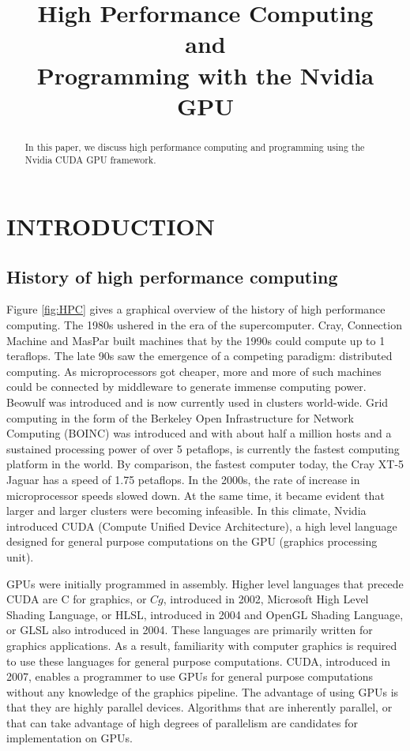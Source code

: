 \documentclass{article}
\title{High Performance Computing \\and\\Programming with the Nvidia GPU}
\begin{document}
\maketitle

\begin{abstract}
In this paper, we discuss high performance computing and programming using the Nvidia CUDA GPU framework.
\end{abstract}


\section{INTRODUCTION}
\subsection{History of high performance computing}
Figure \ref{fig:HPC} gives a graphical overview of the history of high performance computing.  The 1980s ushered in the era of the supercomputer.  Cray, Connection Machine and MasPar built machines that by the 1990s could compute up to 1 teraflops.  The late 90s saw the emergence of a competing paradigm: distributed computing.  As microprocessors got cheaper, more and more of such machines could be connected by middleware to generate immense computing power.  Beowulf was introduced and is now currently used in clusters world-wide.  Grid computing in the form of the Berkeley Open Infrastructure for Network Computing (BOINC) was introduced and with about half a million hosts and a sustained processing power of over 5 petaflops, is currently the fastest computing platform in the world.  By comparison, the fastest computer today, the Cray XT-5 Jaguar has a speed of 1.75 petaflops.  In the 2000s, the rate of increase in microprocessor speeds slowed down.  At the same time, it became evident that larger and larger clusters were becoming infeasible.  In this climate, Nvidia introduced CUDA (Compute Unified Device Architecture), a high level language designed for general purpose computations on the GPU (graphics processing unit).

GPUs were initially programmed in assembly.  Higher level languages that precede CUDA are C for graphics, or $Cg$, introduced in 2002, Microsoft High Level Shading Language, or HLSL, introduced in 2004 and OpenGL Shading Language, or GLSL also introduced in 2004.  These languages are primarily written for graphics applications.  As a result, familiarity with computer graphics is required to use these languages for general purpose computations.  CUDA, introduced in 2007, enables a programmer to use GPUs for general purpose computations without any knowledge of the graphics pipeline.  The advantage of using GPUs is that they are highly parallel devices.  Algorithms that are inherently parallel, or that can take advantage of high degrees of parallelism are candidates for implementation on GPUs.
\end{document}
